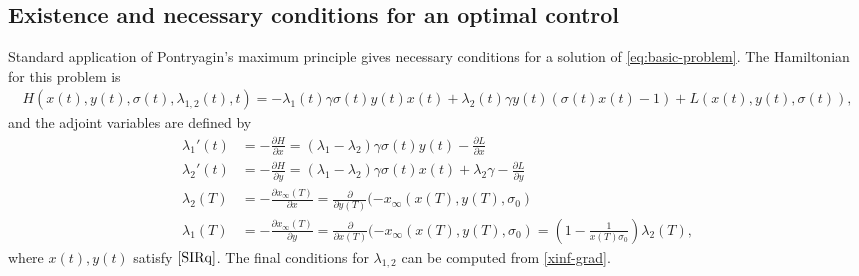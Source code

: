 \documentclass[english,12pt,letter]{article}
\newcommand{\Rnot}{\sigma_0}
\newcommand{\Sinf}{x_\infty}
\begin{document}
\subsection{Existence and necessary conditions for an optimal control\label{sec:pmp}}
Standard application of Pontryagin's maximum principle gives necessary conditions
for a solution of \eqref{eq:basic-problem}.  The Hamiltonian for this problem is
\begin{align} \label{eq:ham}
    H(x(t),y(t), \sigma(t), \lambda_{1,2}(t), t) = -\lambda_1(t) \gamma \sigma(t) y(t) x(t) + \lambda_2(t)\gamma y(t)(\sigma(t) x(t) - 1) + L(x(t),y(t),\sigma(t)),
\end{align}
and the adjoint variables are defined by
\begin{subequations}\label{lambda-odes}
\begin{align} 
    \lambda_1'(t) & = -\frac{\partial H}{\partial x} = (\lambda_1-\lambda_2)\gamma\sigma(t) y(t) - \frac{\partial L}{\partial x} \\
    \lambda_2'(t) & = -\frac{\partial H}{\partial y} = (\lambda_1-\lambda_2)\gamma\sigma(t) x(t) + \lambda_2 \gamma - \frac{\partial L}{\partial y} \\
    \lambda_2(T) & = -\frac{\partial \Sinf(T)}{\partial x} = \frac{\partial }{\partial y(T)} (-x_\infty(x(T),y(T),\Rnot) \\
    \lambda_1(T) & = -\frac{\partial \Sinf(T)}{\partial y} =\frac{\partial }{\partial x(T)} (-x_\infty(x(T),y(T),\Rnot) = \left(1-\frac{1}{x(T)\Rnot}\right)\lambda_2(T),
\end{align}
\end{subequations}
where $x(t), y(t)$ satisfy $\eqref{SIRq}$.
The final conditions for $\lambda_{1,2}$ can be computed from \eqref{xinf-grad}.
\end{document}
